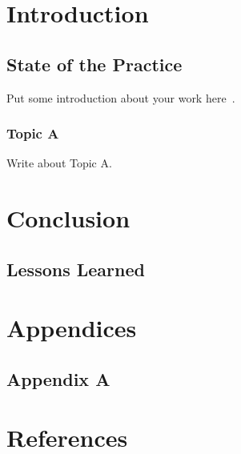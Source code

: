\documentclass[letterpaper,12pt]{article}
\begin{document}
\renewcommand{\thepage}{\roman{page}}













\normalfont
\section{Introduction}
\vspace{.25in}
\subsection{State of the Practice}
\begin{flushleft}
Put some introduction about your work here~\cite{benson}. \lipsum[2]
\end{flushleft}
\subsubsection{Topic A}
\begin{flushleft}
Write about Topic A.
\end{flushleft}
\clearpage

\section{Conclusion}
\vspace{.25in}
\subsection{Lessons Learned}
\begin{flushleft}
\lipsum[3]
\end{flushleft}
\clearpage

\section{Appendices}
\vspace{.25in}
\subsection{Appendix A}
\begin{flushleft}
\lipsum[4]
\end{flushleft}
\clearpage

\section*{References}
\vspace{.15in}


\clearpage
\end{document}
